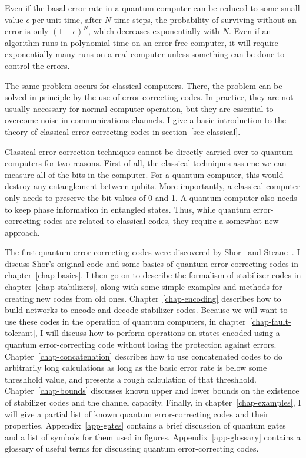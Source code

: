 \documentclass{report}
\begin{document}
Even if the basal error rate in a quantum computer can be reduced to some 
small value $\epsilon$ per unit time, after $N$ time steps, the probability 
of surviving without an error is only $(1-\epsilon)^N$, which decreases 
exponentially with $N$.  Even if an algorithm runs in polynomial time on an 
error-free computer, it will require exponentially many runs on a real 
computer unless something can be done to control the errors.

The same problem occurs for classical computers.  There, the problem can 
be solved in principle by the use of error-correcting codes.  In practice, 
they are not usually necessary for normal computer operation, but they 
are essential to overcome noise in communications channels.  I give a basic 
introduction to the theory of classical error-correcting codes in 
section~\ref{sec-classical}.

Classical error-correction techniques cannot be directly carried over to 
quantum computers for two reasons.  First of all, the classical techniques 
assume we can measure all of the bits in the computer.  For a quantum 
computer, this would destroy any entanglement between qubits.  More 
importantly, a classical computer only needs to preserve the bit 
values of 0 and 1.  A quantum computer also needs to keep phase 
information in entangled states.  Thus, while quantum error-correcting 
codes are related to classical codes, they require a somewhat new 
approach.

The first quantum error-correcting codes were discovered by 
Shor~\cite{shor-9qubit} and Steane~\cite{steane-7qubit}.  I discuss Shor's 
original code and some basics of quantum error-correcting codes in 
chapter~\ref{chap-basics}.  I then go on to describe the formalism of 
stabilizer codes in chapter~\ref{chap-stabilizers}, along with some 
simple examples and methods for creating new codes from old ones.  
Chapter~\ref{chap-encoding} describes how to build networks to encode 
and decode stabilizer codes.  Because we will want to use these codes in 
the operation of quantum computers, in chapter~\ref{chap-fault-tolerant}, 
I will discuss how to perform operations on states encoded using a 
quantum error-correcting code without losing the protection against errors. 
Chapter~\ref{chap-concatenation} describes how to use concatenated codes
to do arbitrarily long calculations as long as the basic error rate is
below some threshhold value, and presents a rough calculation of that 
threshhold. Chapter~\ref{chap-bounds} discusses known upper and lower bounds on 
the existence of stabilizer codes and the channel capacity.  Finally, in 
chapter~\ref{chap-examples}, I will give a partial list of known 
quantum error-correcting codes and their properties.  Appendix~\ref{app-gates}
contains a brief discussion of quantum gates and a list of symbols for
them used in figures.  Appendix~\ref{app-glossary} contains a glossary
of useful terms for discussing quantum error-correcting codes.
\end{document}
